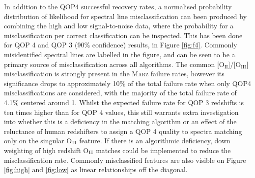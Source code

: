 \documentclass[iop]{emulateapj}
\newcommand{\marz}{\textsc{Marz}}
\begin{document}
In addition to the QOP4 successful recovery rates, a normalised probability distribution of likelihood for spectral line misclassification can been produced by combining the high and low signal-to-noise data, where the probability for a misclassification per correct classification can be inspected. This has been done for QOP 4 and QOP 3 (90\% confidence) results, in Figure \ref{fig:f4}. Commonly misidentified spectral lines are labelled in the figure, and can be seen to be a primary source of misclassification across all algorithms. The common [O$_{\mathrm{II}}$]/[O$_{\mathrm{III}}$] misclassification is strongly present in the \marz{} failure rates, however its significance drops to approximately 10\% of the total failure rate when only QOP4 misclassifications are considered, with the majority of the total failure rate of 4.1\% centered around 1. Whilst the expected failure rate for QOP 3 redshifts is ten times higher than for QOP 4 values, this still warrants extra investigation into whether this is a deficiency in the matching algorithm or an effect of the reluctance of human redshifters to assign a QOP 4 quality to spectra matching only on the singular O$_{\rm{II}}$ feature. If there is an algorithmic deficiency, down weighting of high redshift O$_{\rm{II}}$ matches could be implemented to reduce the misclassification rate. Commonly misclassified features are also visible on Figure \ref{fig:high} and \ref{fig:low} as linear relationships off the diagonal.\\
\end{document}
